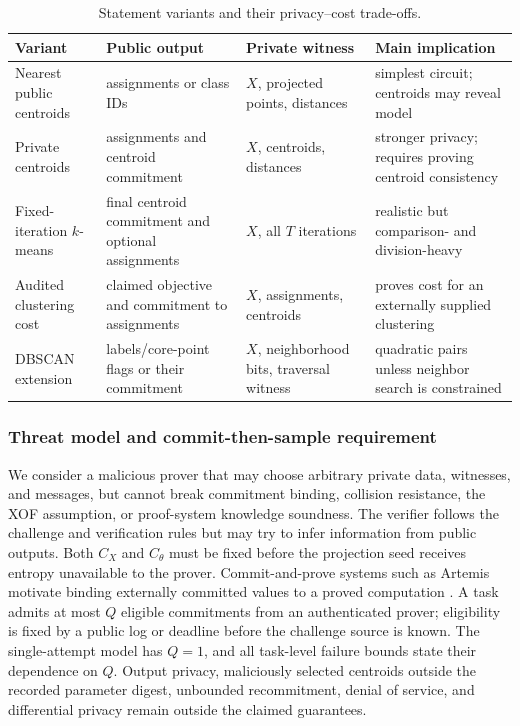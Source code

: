 \documentclass[pdflatex,sn-mathphys-num,iicol]{sn-jnl}
\newcommand{\tpexplain}[1]{}
\theoremstyle{plain}
\theoremstyle{definition}
\theoremstyle{remark}
\begin{document}
\begin{table}[!htbp]
\caption{Statement variants and their privacy--cost trade-offs.}\label{tab:statements}
\centering\small
\begin{adjustbox}{max width=\textwidth}
\begin{tabularx}{\textwidth}{@{}Y Y Y Y@{}}
\toprule
Variant & Public output & Private witness & Main implication \\
\midrule
Nearest public centroids & assignments or class IDs & $X$, projected points, distances & simplest circuit; centroids may reveal model \\
Private centroids & assignments and centroid commitment & $X$, centroids, distances & stronger privacy; requires proving centroid consistency \\
Fixed-iteration $k$-means & final centroid commitment and optional assignments & $X$, all $T$ iterations & realistic but comparison- and division-heavy \\
Audited clustering cost & claimed objective and commitment to assignments & $X$, assignments, centroids & proves cost for an externally supplied clustering \\
DBSCAN extension & labels/core-point flags or their commitment & $X$, neighborhood bits, traversal witness & quadratic pairs unless neighbor search is constrained \\
\bottomrule
\end{tabularx}
\end{adjustbox}
\end{table}

\subsubsection{Threat model and commit-then-sample requirement}
\tpexplain{Paragraph 1 --- enumerate malicious capabilities and explicit non-goals. Say who supplies randomness and what must be unpredictable at commitment time.}
We consider a malicious prover that may choose arbitrary private data, witnesses, and messages, but cannot break commitment binding, collision resistance, the XOF assumption, or proof-system knowledge soundness. The verifier follows the challenge and verification rules but may try to infer information from public outputs. Both $C_X$ and $C_\theta$ must be fixed before the projection seed receives entropy unavailable to the prover. Commit-and-prove systems such as Artemis motivate binding externally committed values to a proved computation \cite{artemis2024}. A task admits at most $Q$ eligible commitments from an authenticated prover; eligibility is fixed by a public log or deadline before the challenge source is known. The single-attempt model has $Q=1$, and all task-level failure bounds state their dependence on $Q$. Output privacy, maliciously selected centroids outside the recorded parameter digest, unbounded recommitment, denial of service, and differential privacy remain outside the claimed guarantees.
\end{document}
